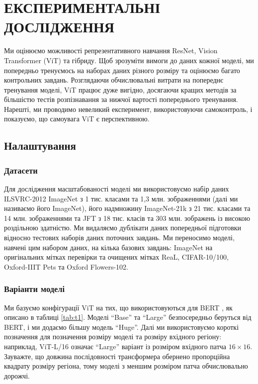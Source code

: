 \chapter[Експериментальні дослідження]{ЕКСПЕРИМЕНТАЛЬНІ ДОСЛІДЖЕННЯ}
Ми оцінюємо можливості репрезентативного навчання
ResNet, Vision Transformer (ViT) та гібриду.
Щоб зрозуміти вимоги до даних кожної моделі, ми попередньо
тренуємось на наборах даних різного розміру та оцінюємо багато
контрольних завдань. Розглядаючи обчислювальні витрати на
попереднє тренування моделі, ViT працює дуже вигідно,
досягаючи кращих методів за більшістю тестів розпізнавання
за нижчої вартості попереднього тренування. Нарешті, ми проводимо
невеликий експеримент, використовуючи самоконтроль,
і показуємо, що самоувага ViT є перспективною.

\section{Налаштування}
\subsection{Датасети}
Для дослідження масштабованості моделі ми використовуємо
набір даних ILSVRC-2012 ImageNet з 1 тис. класами та 1,3 млн. зображеннями
(далі ми називаємо його ImageNet), його надмножину ImageNet-21k
з 21 тис. класами та 14 млн. зображеннями та JFT з 18 тис. 
класів та 303 млн. зображень із високою роздільною здатністю.
Ми видаляємо дублікати даних попередньої підготовки
відносно тестових наборів даних поточних завдань.
Ми переносимо моделі, навчені цим набором даних, на кілька базових завдань:
ImageNet на оригінальних мітках перевірки та очищених мітках ReaL,
CIFAR-10/100, Oxford-IIIT Pets та Oxford Flowers-102.

\subsection{Варіанти моделі}
Ми базуємо конфігурації ViT на тих, що використовуються для
BERT \cite{bert}, як описано в таблиці \ref{tab:t1}.
Моделі ``Base'' та ``Large'' безпосередньо беруться від BERT,
і ми додаємо більшу модель ``Huge''. Далі ми використовуємо
короткі позначення для позначення розміру моделі
та розміру вхідного регіону: наприклад, ViT-L/16 означає ``Large''
варіант із розміром вхідного патча $16 \times 16$.
Зауважте, що довжина послідовності трансформера
обернено пропорційна квадрату розміру регіона,
тому моделі з меншим розміром патча обчислювально дорожчі.

